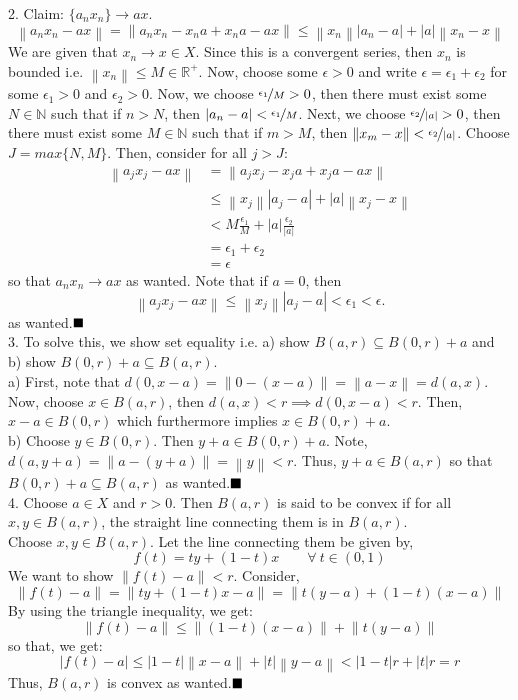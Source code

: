 \documentclass{article}
\newcommand{\norm}[1]{\left\lVert#1\right\rVert}
\begin{document}
    2. Claim: $\{a_nx_n\}\to ax$.
    \[ \norm{a_nx_n - ax} = \norm{a_nx_n - x_na + x_na - ax} \leq \norm{x_n}|a_n-a| + |a|\norm{x_n-x} \]
    We are given that $x_n\to x\in X$. Since this is a convergent series, then $x_n$ is bounded i.e. $\norm{x_n}\leq M\in\mathbb{R}^+$.
    Now, choose some $\epsilon>0$ and write $\epsilon = \epsilon_1 + \epsilon_2$ for some $\epsilon_1>0$ and $\epsilon_2>0$. Now, 
    we choose $\nicefrac{\epsilon_1}{M}>0$, then there must exist some $N\in\mathbb{N}$ such that if $n>N$, then 
    $|a_n-a|<\nicefrac{\epsilon_1}{M}$. Next, we choose $\nicefrac{\epsilon_2}{|a|}>0$, then there must exist some $M\in\mathbb{N}$
    such that if $m>M$, then $\norm{x_m-x}<\nicefrac{\epsilon_2}{|a|}$. Choose $J = max\{N,M\}$. Then, consider for all
    $j > J$:
    \begin{align*}
        \norm{a_jx_j - ax} &= \norm{a_jx_j - x_ja + x_ja - ax} \\
                            &\leq \norm{x_j}|a_j-a| + |a|\norm{x_j-x} \\
                            &< M\frac{\epsilon_1}{M} + |a|\frac{\epsilon_2}{|a|} \\
                            &= \epsilon_1 + \epsilon_2 \\
                            &= \epsilon
    \end{align*}
    so that $a_nx_n \to ax$ as wanted. Note that if $a = 0$, then 
    \[ \norm{a_jx_j - ax}\leq \norm{x_j}|a_j-a| < \epsilon_1 < \epsilon.\]
    as wanted.$\hfill\blacksquare$\\

    3. To solve this, we show set equality i.e. a) show $B(a,r)\subseteq B(0,r) + a$ and b) show $B(0,r)+a\subseteq B(a,r)$.\\
    a) First, note that $d(0,x-a) = \norm{0-(x-a)} = \norm{a-x} = d(a,x)$. 
    Now, choose $x\in B(a,r)$, then $d(a,x)<r \implies d(0,x-a)<r$.
    Then, $x-a\in B(0,r)$ which furthermore implies $x\in B(0,r)+a$.\\
    b) Choose $y\in B(0,r)$. Then $y+a\in B(0,r)+a$. Note, $d(a,y+a) = \norm{a-(y+a)}=\norm{y}<r$. Thus, $y+a\in B(a,r)$ so that
    $B(0,r)+a\subseteq B(a,r)$ as wanted.$\hfill\blacksquare$\\

    4. Choose $a\in X$ and $r>0$. Then $B(a,r)$ is said to be convex if for all $x,y\in B(a,r)$, the straight line connecting them
    is in $B(a,r)$.\\
    Choose $x,y\in B(a,r)$. Let the line connecting them be given by,
    \[ f(t) = ty + (1-t)x \qquad\forall\:t\in(0,1) \]
    We want to show $\norm{f(t)-a}<r$. Consider,
    \[ \norm{f(t)-a} = \norm{ty + (1-t)x - a} = \norm{t(y-a)+(1-t)(x-a)} \]
    By using the triangle inequality, we get:
    \[ \norm{f(t)-a} \leq \norm{(1-t)(x-a)} + \norm{t(y-a)} \]
    so that, we get: 
    \[ |f(t)-a| \leq |1-t|\norm{x-a} + |t|\norm{y-a} < |1-t|r + |t|r = r\]
    Thus, $B(a,r)$ is convex as wanted.$\hfill\blacksquare$\\
\end{document}
